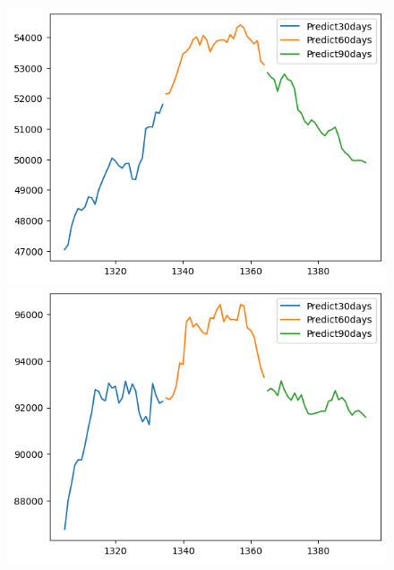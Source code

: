\begin{figure}[H]
\begin{minipage}{0.15\textwidth}
    \end{minipage}
    \hfill
        \begin{minipage}{0.15\textwidth}
    \centering
    \includegraphics[width=1\textwidth]{resources/chapter-5/newdata1/predicted/BIDV_NBeats_9-1_30days.png}
    \end{minipage}
    \hfill
    \begin{minipage}{0.15\textwidth}
    \centering
    \includegraphics[width=1\textwidth]{resources/chapter-5/newdata1/predicted/VCB_NBeats_7-3_30days.png}
    \end{minipage}
    \hfill
    \begin{minipage}{0.15\textwidth}
    \centering

\end{minipage}
\end{figure}
